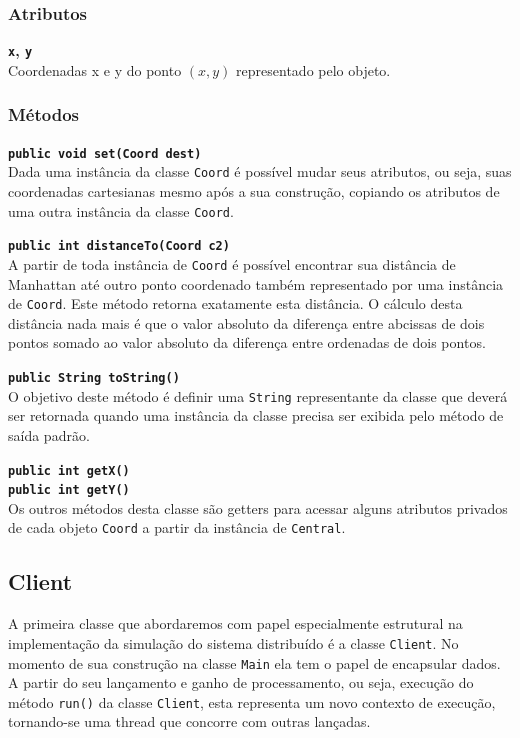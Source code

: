 \documentclass[a4paper,landscape,12pt]{article}
\begin{document}
\subsubsection{Atributos}

\textbf{\texttt{x}, \texttt{y}} \\
Coordenadas x e y do ponto $(x,y)$ representado pelo objeto.

\subsubsection{Métodos}
\textbf{\texttt{public void set(Coord dest)}} \\
Dada uma instância da classe \texttt{Coord} é possível mudar seus atributos, ou seja, suas coordenadas cartesianas mesmo após a sua construção, copiando os atributos de uma outra instância da classe \texttt{Coord}.

\textbf{\texttt{public int distanceTo(Coord c2)}} \\
A partir de toda instância de \texttt{Coord} é possível encontrar sua distância de Manhattan até outro ponto coordenado também representado por uma instância de \texttt{Coord}. Este método retorna exatamente esta distância. O cálculo desta distância nada mais é que o valor absoluto da diferença entre abcissas de dois pontos somado ao valor absoluto da diferença entre ordenadas de dois pontos.

\textbf{\texttt{public String toString()}} \\
O objetivo deste método é definir uma \texttt{String} representante da classe que deverá ser retornada quando uma instância da classe precisa ser exibida pelo método de saída padrão.

\textbf{\texttt{public int getX() \\
public int getY()}} \\
Os outros métodos desta classe são getters para acessar alguns atributos privados de cada objeto \texttt{Coord} a partir da instância de \texttt{Central}.

\subsection{Client}
A primeira classe que abordaremos com papel especialmente estrutural na implementação da simulação do sistema distribuído é a classe \texttt{Client}. No momento de sua construção na classe \texttt{Main} ela tem o papel de encapsular dados. A partir do seu lançamento e ganho de processamento, ou seja, execução do método \texttt{run()} da classe \texttt{Client}, esta representa um novo contexto de execução, tornando-se uma thread que concorre com outras lançadas.
\end{document}
